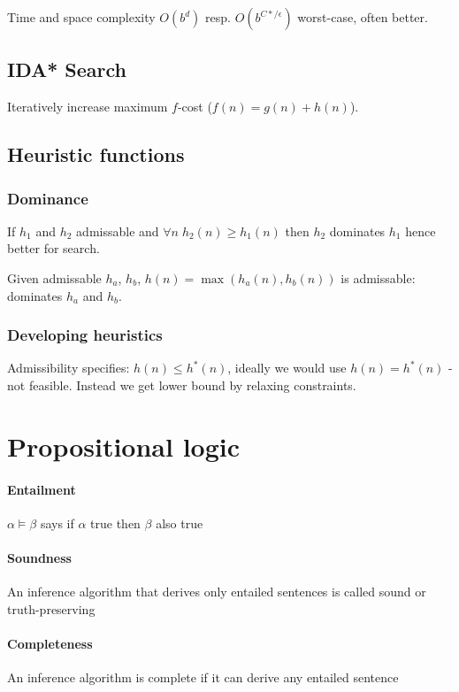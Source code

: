 \begin{multicols}{4}
Time and space complexity $O(b^d)$ resp. $O(b^{C*/\epsilon})$ worst-case, often better.

\subsection{IDA* Search}

Iteratively increase maximum $f$-cost ($f(n) = g(n)+h(n)$).

\subsection{Heuristic functions}

\subsubsection{Dominance}

If $h_1$ and $h_2$ admissable and $\forall n \; h_2(n) \geq h_1(n)$ then $h_2$ dominates $h_1$ hence better for search.

Given admissable $h_a$, $h_b$, $h(n) = \max(h_a(n), h_b(n))$ is admissable: dominates $h_a$ and $h_b$.

\subsubsection{Developing heuristics}

Admissibility specifies: $h(n) \leq h^*(n)$, ideally we would use $h(n) = h^*(n)$ - not feasible. Instead we get lower bound by relaxing constraints.

\section{Propositional logic}

\paragraph{Entailment} $\alpha \models \beta$ says if $\alpha$ true then $\beta$ also true
\paragraph{Soundness} An inference algorithm that derives only entailed sentences is called sound or truth-preserving
\paragraph{Completeness} An inference algorithm is complete if it can derive any entailed sentence


\end{multicols}
